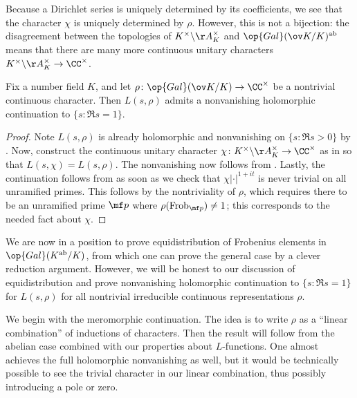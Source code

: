 \documentclass[../thesis.tex]{subfiles}
\begin{document}
\begin{remark}
	Because a Dirichlet series is uniquely determined by its coefficients, we see that the character $\chi$ is uniquely determined by $\rho$. However, this is not a bijection: the disagreement between the topologies of $K^\times\backslash\AA_K^\times$ and $\op{Gal}(\ov K/K)^{\mathrm{ab}}$ means that there are many more continuous unitary characters $K^\times\backslash\AA_K^\times\to\CC^\times$.
\end{remark}
\begin{corollary} \label{cor:abelian-artin-nonvanish}
	Fix a number field $K$, and let $\rho\colon\op{Gal}(\ov K/K)\to\CC^\times$ be a nontrivial continuous character. Then $L(s,\rho)$ admits a nonvanishing holomorphic continuation to $\{s:\Re s=1\}$.
\end{corollary}
\begin{proof}
	Note $L(s,\rho)$ is already holomorphic and nonvanishing on $\{s:\Re s>0\}$ by . Now, construct the continuous unitary character $\chi\colon K^\times\backslash\AA_K^\times\to\CC^\times$ as in  so that $L(s,\chi)=L(s,\rho)$. The nonvanishing now follows from . Lastly, the continuation follows from  as soon as we check that $\chi\left|\cdot\right|^{1+it}$ is never trivial on all unramified primes. This follows by the nontriviality of $\rho$, which requires there to be an unramified prime $\mf p$ where $\rho(\mathrm{Frob}_{\mf p})\ne1$; this corresponds to the needed fact about $\chi$.
\end{proof}
We are now in a position to prove equidistribution of Frobenius elements in $\op{Gal}(K^{\mathrm{ab}}/K)$, from which one can prove the general case by a clever reduction argument. However, we will be honest to our discussion of equidistribution and prove nonvanishing holomorphic continuation to $\{s:\Re s=1\}$ for $L(s,\rho)$ for all nontrivial irreducible continuous representations $\rho$.

We begin with the meromorphic continuation. The idea is to write $\rho$ as a ``linear combination'' of inductions of characters. Then the result will follow from the abelian case combined with our properties about $L$-functions. One almost achieves the full holomorphic nonvanishing as well, but it would be technically possible to see the trivial character in our linear combination, thus possibly introducing a pole or zero.
\end{document}
